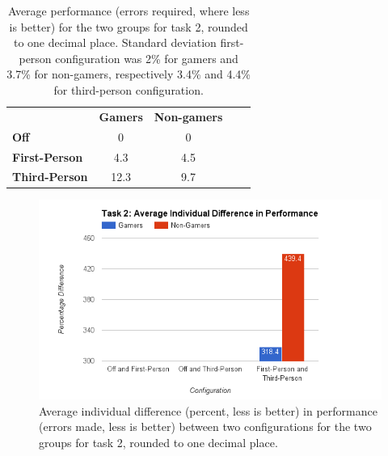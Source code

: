 \documentclass[runningheads,a4paper,oribibl]{llncs}
\begin{document}
\begin{table}[]
\centering
\label{tab:Task2GraphP}
\setlength{\tabcolsep}{1em}
\def\arraystretch{1.8}
\begin{tabular}{l|c|cll}
                      & {\textbf{Gamers}} & {\textbf{Non-gamers}} &  &  \\ \cline{1-3}
\textbf{Off}          & 0                                    & 0                                          &  &  \\ \cline{1-3}
\textbf{First-Person} & 4.3                                   & 4.5                                        &  &  \\ \cline{1-3}
\textbf{Third-Person} & 12.3                                    & 9.7                                        &  & 
\end{tabular}
\caption{Average performance (errors required, where less is better) for the two groups for task 2, rounded to one decimal place. Standard deviation first-person configuration was 2\% for gamers and 3.7\% for non-gamers, respectively 3.4\% and 4.4\% for third-person configuration.}
\end{table}





\begin{figure}
   \centering
   \includegraphics[width=\textwidth]{ExternalMaterial/Task2GraphD}
   \caption{Average individual difference (percent, less is better) in performance (errors made, less is better) between two configurations for the two groups for task 2, rounded to one decimal place.} \label{fig:Task2GraphD}
\end{figure}
\end{document}
